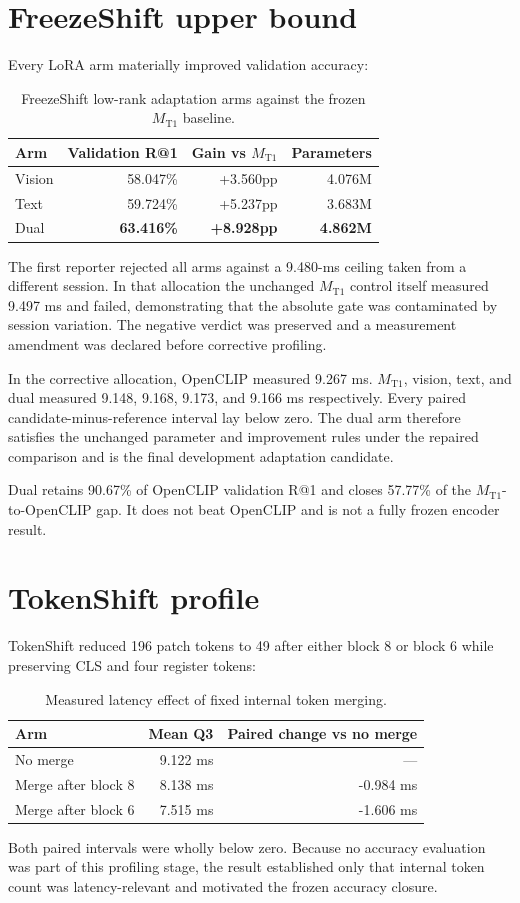 \documentclass[11pt,a4paper,oneside]{report}
\newcommand{\MTone}{\ensuremath{M_{\mathrm{T1}}}}
\begin{document}
\section{FreezeShift upper bound}
Every LoRA arm materially improved validation accuracy:

\begin{table}[htbp]
\centering
\caption{FreezeShift low-rank adaptation arms against the frozen \MTone{} baseline.}
\label{tab:freezeshift}
\begin{tabular}{L{4.5cm}rrr}
\toprule
Arm & Validation R@1 & Gain vs \MTone{} & Parameters \\
\midrule
Vision & 58.047\% & +3.560pp & 4.076M \\
Text & 59.724\% & +5.237pp & 3.683M \\
Dual & \textbf{63.416\%} & \textbf{+8.928pp} & \textbf{4.862M} \\
\bottomrule
\end{tabular}
\end{table}
The first reporter rejected all arms against a 9.480-ms ceiling taken from a different session. In that allocation the unchanged \MTone{} control itself measured 9.497 ms and failed, demonstrating that the absolute gate was contaminated by session variation. The negative verdict was preserved and a measurement amendment was declared before corrective profiling.

In the corrective allocation, OpenCLIP measured 9.267 ms. \MTone{}, vision, text, and dual measured 9.148, 9.168, 9.173, and 9.166 ms respectively. Every paired candidate-minus-reference interval lay below zero. The dual arm therefore satisfies the unchanged parameter and improvement rules under the repaired comparison and is the final development adaptation candidate.

Dual retains 90.67\% of OpenCLIP validation R@1 and closes 57.77\% of the \MTone{}-to-OpenCLIP gap. It does not beat OpenCLIP and is not a fully frozen encoder result.

\section{TokenShift profile}
TokenShift reduced 196 patch tokens to 49 after either block 8 or block 6 while preserving CLS and four register tokens:

\begin{table}[htbp]
\centering
\caption{Measured latency effect of fixed internal token merging.}
\label{tab:tokenshift-latency}
\begin{tabular}{L{5.5cm}rr}
\toprule
Arm & Mean Q3 & Paired change vs no merge \\
\midrule
No merge & 9.122 ms & --- \\
Merge after block 8 & 8.138 ms & -0.984 ms \\
Merge after block 6 & 7.515 ms & -1.606 ms \\
\bottomrule
\end{tabular}
\end{table}
Both paired intervals were wholly below zero. Because no accuracy evaluation was part of this profiling stage, the result established only that internal token count was latency-relevant and motivated the frozen accuracy closure.
\end{document}
